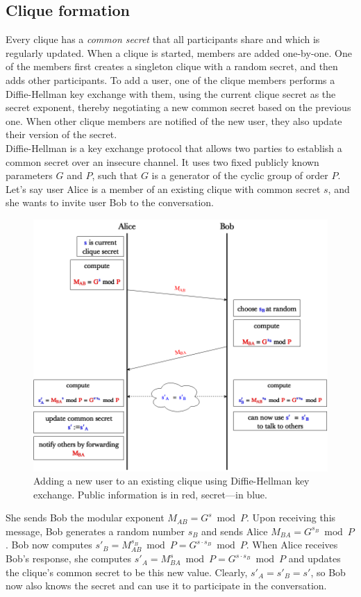 \documentclass[a4paper, twoside, 12pt]{report}
\begin{document}
\subsection{Clique formation}
\label{subsec:prep.formation}
Every clique has a \emph{common secret} that all participants share and which is regularly updated. When a clique is started, members are added one-by-one. One of the members first creates a singleton clique with a random secret, and then adds other participants. To add a user, one of the clique members performs a Diffie-Hellman key exchange \cite{diffie1976new} with them, using the current clique secret as the secret exponent, thereby negotiating a new common secret based on the previous one. When other clique members are notified of the new user, they also update their version of the secret. \\

Diffie-Hellman is a key exchange protocol that allows two parties to establish a common secret over an insecure channel. It uses two fixed publicly known parameters $G$ and $P$, such that $G$ is a generator of the cyclic group of order $P$. Let's say user Alice is a member of an existing clique with common secret $s$, and she wants to invite user Bob to the conversation. 
\begin{figure}[h]
    \captionsetup{width=0.80\textwidth}
    \centering
    \includegraphics[width = 0.80 \linewidth]{pics/DH.png}
    \caption{Adding a new user to an existing clique using Diffie-Hellman key exchange. Public information is in {\color{red}red}, secret---in {\color{blue}blue}.}
    \label{fig:DH}
\end{figure}

She sends Bob the modular exponent $M_{AB} = G^{s} \bmod P$. Upon receiving this message, Bob generates a random number $s_B$ and sends Alice $M_{BA} = G^{s_B} \bmod P$. Bob now computes $s'_B = M_{AB}^{s_B} \bmod P = G^{s \cdot s_B} \bmod P$. When Alice receives Bob's response, she computes $s'_A = M_{BA}^{s} \bmod P = G^{s \cdot s_B} \bmod P$ and updates the clique's common secret to be this new value. Clearly, $s'_A = s'_B = s'$, so Bob now also knows the secret and can use it to participate in the conversation.  \\
\end{document}
